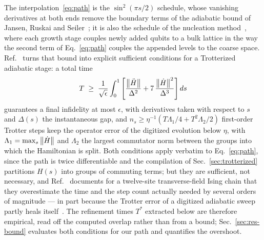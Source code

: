 \documentclass[
  aps,            %
  prc,            %
  reprint,        %
  superscriptaddress,
  floatfix,
  nofootinbib
]{revtex4-2}
\begin{document}
The interpolation~\eqref{eq:path} is the $\sin^2(\pi s/2)$ schedule, whose
vanishing derivatives at both ends remove the boundary terms of the adiabatic
bound of Jansen, Ruskai and Seiler~\cite{Jansen2007}; it is also the schedule
of the nucleation method~\cite{Sadia2026}, where each growth stage couples
newly added qubits to a bulk lattice in the way the second term of
Eq.~\eqref{eq:path} couples the appended levels to the coarse space.
Ref.~\cite{Sadia2026} turns that bound into explicit sufficient conditions
for a Trotterized adiabatic stage: a total time
\begin{equation}
  T\;\ge\;\frac{1}{\sqrt{\epsilon}}\int_0^1
  \left[\frac{\norm{\ddot H}}{\Delta^2}+7\,\frac{\norm{\dot H}^2}{\Delta^3}\right]ds
  \label{eq:Tbound}
\end{equation}
guarantees a final infidelity at most $\epsilon$, with derivatives taken with
respect to $s$ and $\Delta(s)$ the instantaneous gap, and
$n_s\ge\eta^{-1}(T\Lambda_1/4+T^2\Lambda_2/2)$ first-order Trotter steps keep
the operator error of the digitized evolution below $\eta$, with
$\Lambda_1=\max_s\norm{\dot H}$ and $\Lambda_2$ the largest commutator norm
between the groups into which the Hamiltonian is split.  Both conditions
apply verbatim to Eq.~\eqref{eq:path}, since the path is twice differentiable
and the compilation of Sec.~\ref{sec:trotterized} partitions $H(s)$ into
groups of commuting terms; but they are sufficient, not necessary, and
Ref.~\cite{Sadia2026} documents for a twelve-site transverse-field Ising
chain that they overestimate the time and the step count actually needed by
several orders of magnitude --- in part because the Trotter error of a
digitized adiabatic sweep partly heals itself~\cite{Kovalsky2023}.  The
refinement times $T^{*}$ extracted below are therefore empirical, read off
the computed overlap rather than from a bound; Sec.~\ref{sec:res-bound}
evaluates both conditions for our path and quantifies the overshoot.
\end{document}
